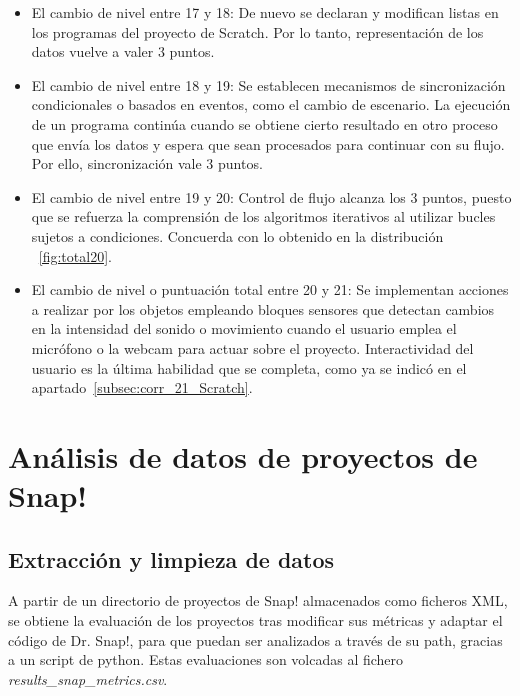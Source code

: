 \documentclass[a4paper, 12pt]{book}
\begin{document}
\begin{itemize}
 \item El cambio de nivel entre 17 y 18: De nuevo se declaran y modifican listas en los programas del proyecto de Scratch. 
 Por lo tanto, representación de los datos vuelve a valer 3 puntos.
 \item El cambio de nivel entre 18 y 19: Se establecen mecanismos de sincronización condicionales o basados en eventos, como el cambio de escenario. La ejecución de un programa continúa cuando se obtiene cierto resultado en otro proceso que envía los datos y espera que sean procesados para continuar con su flujo. Por ello, sincronización vale 3 puntos.
 \item El cambio de nivel entre 19 y 20: Control de flujo alcanza los 3 puntos, puesto que se refuerza la comprensión de los algoritmos iterativos al utilizar bucles sujetos a condiciones. Concuerda con lo obtenido en la distribución ~\ref{fig:total20}. 
 \item El cambio de nivel o puntuación total entre 20 y 21: Se implementan acciones a realizar por los objetos empleando bloques sensores que detectan cambios en la intensidad del sonido o movimiento cuando el usuario emplea el micrófono o la webcam para actuar sobre el proyecto. Interactividad del usuario es la última habilidad que se completa, como ya se indicó en el apartado~\ref{subsec:corr_21_Scratch}. 
\end{itemize}


\section{Análisis de datos de proyectos de Snap!} 
\label{sec:result_snap}

\subsection{Extracción y limpieza de datos}
\label{subsec:clean_data_Snap}

A partir de un directorio de proyectos de Snap! almacenados como ficheros XML, se obtiene la evaluación de los proyectos tras modificar sus métricas y adaptar el código de Dr. Snap!, para que puedan ser analizados a través de su path, gracias a un script de python. Estas evaluaciones son volcadas al fichero \emph{results\_snap\_metrics.csv}. 
\end{document}
